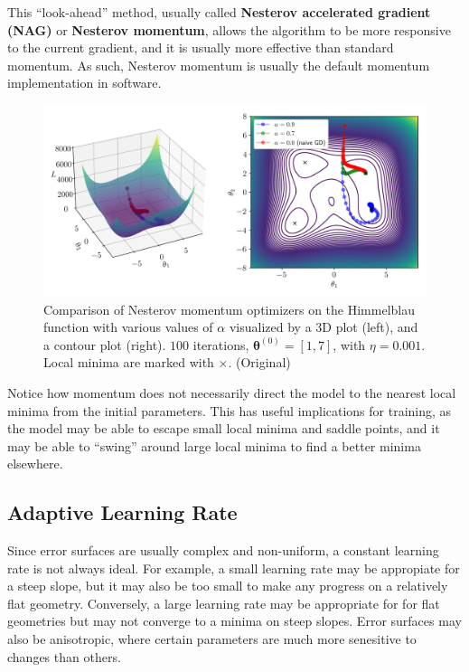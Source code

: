 \documentclass[12pt]{report}
\theoremstyle{definition}
\theoremstyle{remark}
\begin{document}
This ``look-ahead'' method, usually called \textbf{Nesterov accelerated gradient (NAG)} or \textbf{Nesterov momentum}, allows the algorithm to be more responsive to the current gradient, and it is usually more effective than standard momentum. As such, Nesterov momentum is usually the default momentum implementation in software.
\begin{figure}[h]
    \centering
    \includegraphics[width=\linewidth]{figs/nesterov_comparison.png}
    \caption{Comparison of Nesterov momentum optimizers on the Himmelblau function with various values of $\alpha$ visualized by a 3D plot (left), and a contour plot (right). $100$ iterations, $\boldsymbol{\theta}^{(0)} = [1,7]$, with $\eta = 0.001$. Local minima are marked with $\times$. (Original)}
    \label{fig:enter-label}
\end{figure}
Notice how momentum does not necessarily direct the model to the nearest local minima from the initial parameters. This has useful implications for training, as the model may be able to escape small local minima and saddle points, and it may be able to ``swing'' around large local minima to find a better minima elsewhere.

\subsection{Adaptive Learning Rate}
Since error surfaces are usually complex and non-uniform, a constant learning rate is not always ideal. For example, a small learning rate may be appropiate for a steep slope, but it may also be too small to make any progress on a relatively flat geometry. Conversely, a large learning rate may be appropriate for for flat geometries but may not converge to a minima on steep slopes. Error surfaces may also be anisotropic, where certain parameters are much more senesitive to changes than others.
\end{document}
